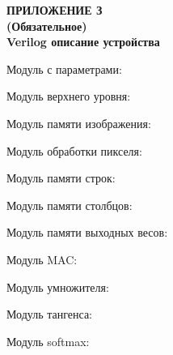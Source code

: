 \clearpage
{}%
\par

\normalsize
\begin{center}
  \textbf{ПРИЛОЖЕНИЕ З} \\
  \textbf{(Обязательное)} \\
  \textbf{Verilog описание устройства}
\end{center}




% 
Модуль с параметрами:



Модуль верхнего уровня:



Модуль памяти изображения:



Модуль обработки пикселя:




Модуль памяти строк:



Модуль памяти столбцов:



Модуль памяти выходных весов:



Модуль MAC:\@



Модуль умножителя:





Модуль тангенса:



Модуль softmax:



\pdfpagewidth=210mm
\pdfpageheight=297mm

